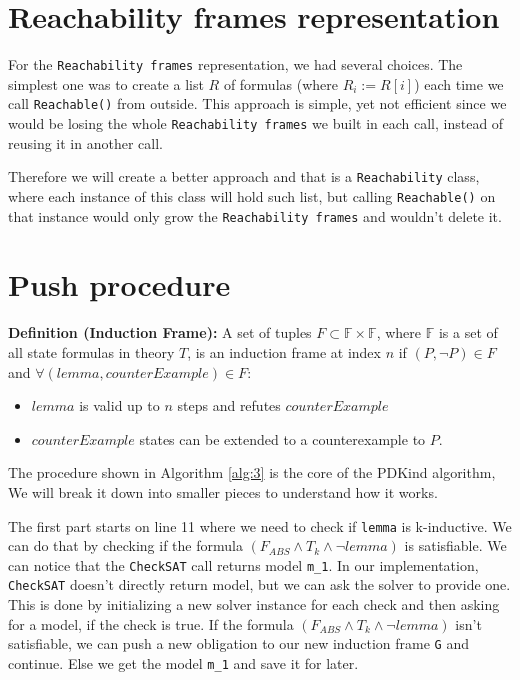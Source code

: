 \section*{Reachability frames representation}\label{RFrames}
\noindent For the \texttt{Reachability frames} representation, we had several choices. The simplest one was to create a list $R$ of formulas (where $R_i := R[i]$) each time we call \texttt{Reachable()} from outside. This approach is simple, yet not efficient since we would be losing the whole \texttt{Reachability frames} we built in each call, instead of reusing it in another call. 

Therefore we will create a better approach and that is a \texttt{Reachability} class, where each instance of this class will hold such list, but calling \texttt{Reachable()} on that instance would only grow the \texttt{Reachability frames} and wouldn't delete it.
\section{Push procedure} \label{Push}

\noindent \textbf{Definition (Induction Frame)\cite{7886665}:}\label{def:IFrame} A set of tuples $F \subset \mathbb{F} \times \mathbb{F}$, where $\mathbb{F}$ is a set of all state formulas in theory $T$, is an induction frame at index $n$ if $(P, \neg P) \in F$ and $\forall (lemma, counterExample) \in F$:
\begin{itemize}
    \item $lemma$ is valid up to $n$ steps and refutes $counterExample$
    \item $counterExample$ states can be extended to a counterexample to $P$.
\end{itemize}

\noindent The procedure shown in Algorithm \ref{alg:3} is the core of the PDKind algorithm, We will break it down into smaller pieces to understand how it works.

The first part starts on line 11 where we need to check if \texttt{lemma} is k-inductive. We can do that by checking if the formula $(F_{ABS} \wedge T_k \wedge \neg lemma)$ is satisfiable. We can notice that the \texttt{CheckSAT} call returns model \texttt{m\_1}. In our implementation, \texttt{CheckSAT} doesn't directly return model, but we can ask the solver to provide one. This is done by initializing a new solver instance for each check and then asking for a model, if the check is true.
If the formula $(F_{ABS} \wedge T_k \wedge \neg lemma)$ isn't satisfiable, we can push a new obligation to our new induction frame \texttt{G} and continue. Else we get the model \texttt{m\_1} and save it for later.

